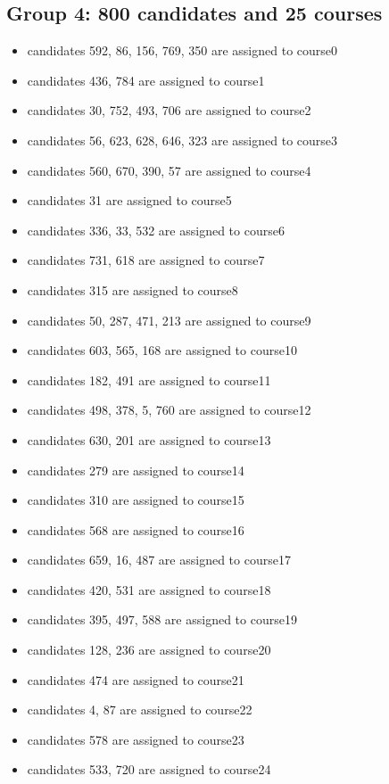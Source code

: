 \documentclass[twoside,twocolumn]{article}
\begin{document}
    \subsection{Group 4: 800 candidates and 25 courses}
    \begin{itemize}
        \item candidates 592, 86, 156, 769, 350 are assigned to course0
        \item candidates 436, 784 are assigned to course1
        \item candidates 30, 752, 493, 706 are assigned to course2
        \item candidates 56, 623, 628, 646, 323 are assigned to course3
        \item candidates 560, 670, 390, 57 are assigned to course4
        \item candidates 31 are assigned to course5
        \item candidates 336, 33, 532 are assigned to course6
        \item candidates 731, 618 are assigned to course7
        \item candidates 315 are assigned to course8
        \item candidates 50, 287, 471, 213 are assigned to course9
        \item candidates 603, 565, 168 are assigned to course10
        \item candidates 182, 491 are assigned to course11
        \item candidates 498, 378, 5, 760 are assigned to course12
        \item candidates 630, 201 are assigned to course13
        \item candidates 279 are assigned to course14
        \item candidates 310 are assigned to course15
        \item candidates 568 are assigned to course16
        \item candidates 659, 16, 487 are assigned to course17
        \item candidates 420, 531 are assigned to course18
        \item candidates 395, 497, 588 are assigned to course19
        \item candidates 128, 236 are assigned to course20
        \item candidates 474 are assigned to course21
        \item candidates 4, 87 are assigned to course22
        \item candidates 578 are assigned to course23
        \item candidates 533, 720 are assigned to course24
    \end{itemize}
\end{document}
